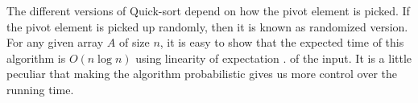 The different versions of Quick-sort depend on how the pivot element is picked.
If the pivot element is picked up randomly, then it is known as randomized version.
For any given array $A$ of size $n$, it is easy to show that the expected time of this algorithm is $O(n \log n)$ using linearity of expectation \citep{motwani2010randomized}.
of the input. It is a little peculiar that making the algorithm probabilistic gives us more control over the running time.
% 
% 
% 
